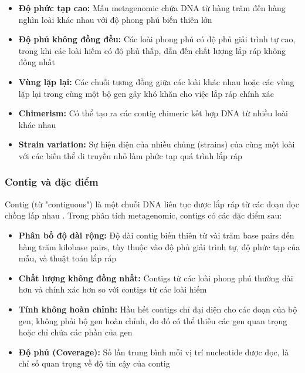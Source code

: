 \begin{itemize}
    \item \textbf{Độ phức tạp cao:} Mẫu metagenomic chứa DNA từ hàng trăm đến hàng nghìn loài khác nhau với độ phong phú biến thiên lớn

    \item \textbf{Độ phủ không đồng đều:} Các loài phong phú có độ phủ giải trình tự cao, trong khi các loài hiếm có độ phủ thấp, dẫn đến chất lượng lắp ráp không đồng nhất

    \item \textbf{Vùng lặp lại:} Các chuỗi tương đồng giữa các loài khác nhau hoặc các vùng lặp lại trong cùng một bộ gen gây khó khăn cho việc lắp ráp chính xác

    \item \textbf{Chimerism:} Có thể tạo ra các contig chimeric kết hợp DNA từ nhiều loài khác nhau

    \item \textbf{Strain variation:} Sự hiện diện của nhiều chủng (strains) của cùng một loài với các biến thể di truyền nhỏ làm phức tạp quá trình lắp ráp
\end{itemize}

\subsubsection{Contig và đặc điểm}

Contig (từ "contiguous") là một chuỗi DNA liên tục được lắp ráp từ các đoạn đọc chồng lấp nhau \cite{setubal2021metagenome,ghurye2016metagenomic}. Trong phân tích metagenomic, contigs có các đặc điểm sau:

\begin{itemize}
    \item \textbf{Phân bố độ dài rộng:} Độ dài contig biến thiên từ vài trăm base pairs đến hàng trăm kilobase pairs, tùy thuộc vào độ phủ giải trình tự, độ phức tạp của mẫu, và thuật toán lắp ráp

    \item \textbf{Chất lượng không đồng nhất:} Contigs từ các loài phong phú thường dài hơn và chính xác hơn so với contigs từ các loài hiếm

    \item \textbf{Tính không hoàn chỉnh:} Hầu hết contigs chỉ đại diện cho các đoạn của bộ gen, không phải bộ gen hoàn chỉnh, do đó có thể thiếu các gen quan trọng hoặc chỉ chứa các phần của gen

    \item \textbf{Độ phủ (Coverage):} Số lần trung bình mỗi vị trí nucleotide được đọc, là chỉ số quan trọng về độ tin cậy của contig
\end{itemize}


